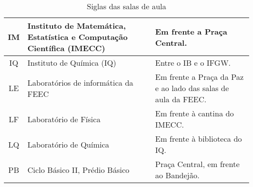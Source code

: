 \begin{table*}[ht!]
\begin{tabular}{|c|p{}|p{}|}
    IM  &  Instituto de Matemática, Estatística e Computação Científica (IMECC)
    &  Em frente a Praça Central.\\ \hline

    IQ  &  Instituto de Química (IQ)  &  Entre o IB e o IFGW.\\ \hline

    LE  &  Laboratórios de informática da FEEC  &  Em frente a Praça da Paz e
    ao lado das salas de aula da FEEC.\\ \hline

    LF  &  Laboratório de Física  &  Em frente à cantina do IMECC.\\ \hline

    LQ  &  Laboratório de Química  &  Em frente à biblioteca do IQ.\\ \hline

    PB  &  Ciclo Básico II, Prédio Básico  &  Praça Central, em frente ao
    Bandejão.\\ \hline
\end{tabular}
\caption{Siglas das salas de aula}
\label{tab:institutos}
\end{table*}
